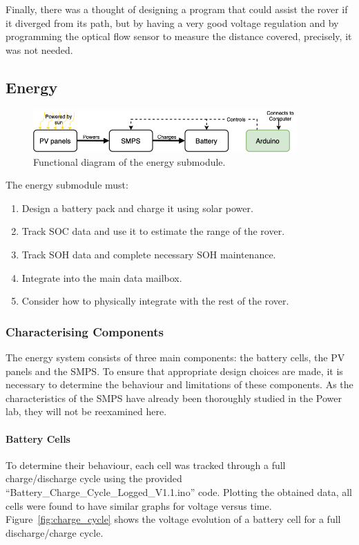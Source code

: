 \documentclass[a4paper]{article}
\begin{document}
Finally, there was a thought of designing a program that could assist the rover if it diverged from its path, but by having a very good voltage regulation and by programming the optical flow sensor to measure the distance covered, precisely, it was not needed. 


\subsection{Energy}
\vspace{-5pt}
\begin{figure}[H]
    \centering
    \includegraphics[width = 0.9\textwidth]{Functional_Diagram.png}
    \caption{Functional diagram of the energy submodule.}
\end{figure}

\vspace{-10pt}
The energy submodule must:
\begin{enumerate}
    \item Design a battery pack and charge it using solar power.
    \item Track SOC data and use it to estimate the range of the rover.
    \item Track SOH data and complete necessary SOH maintenance.
    \item Integrate into the main data mailbox.
    \item Consider how to physically integrate with the rest of the rover.
\end{enumerate}

\subsubsection{Characterising Components}
The energy system consists of three main components: the battery cells, the 
PV panels and the SMPS. To ensure that appropriate design choices are made, 
it is necessary to determine the behaviour and limitations of these components.
As the characteristics of the SMPS have already been thoroughly studied in
the Power lab\cite{powerLogbook}, they will not be reexamined here.

\paragraph*{Battery Cells}
\vspace{-6pt}
To determine their behaviour, each cell was tracked through a full charge/discharge 
cycle using the provided “Battery\_Charge\_Cycle\_Logged\_V1.1.ino” 
code\cite{chargeCode}. Plotting the obtained data, all cells were found to 
have similar graphs for voltage versus time. Figure~\ref{fig:charge_cycle} 
shows the voltage evolution of a battery cell for a full discharge/charge cycle.
\end{document}

